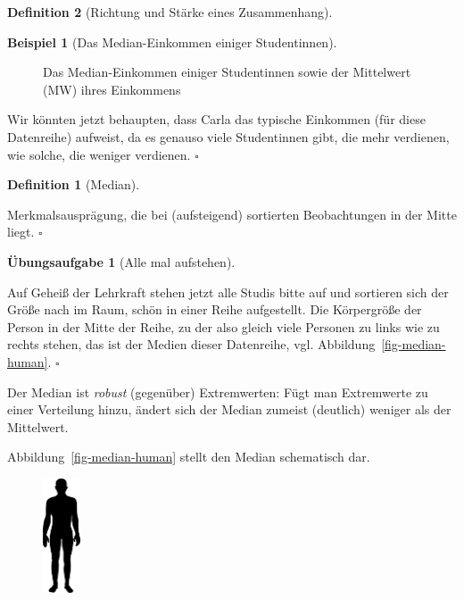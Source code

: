\documentclass[
  a4paper,
  DIV=11]{scrreprt}
\theoremstyle{definition}
\newtheorem{exercise}{Übungsaufgabe}[chapter]
\theoremstyle{definition}
\newtheorem{example}{Beispiel}[chapter]
\theoremstyle{definition}
\newtheorem{definition}{Definition}[chapter]
\theoremstyle{remark}
\begin{document}
\begin{definition}[Richtung und Stärke eines
Zusammenhang]
\begin{example}[Das Median-Einkommen einiger
Studentinnen]
\begin{figure}
\begin{minipage}{\linewidth}
{}


\end{minipage}%

\caption{\label{fig-md1}Das Median-Einkommen einiger Studentinnen sowie
der Mittelwert (MW) ihres Einkommens}

\end{figure}%

Wir könnten jetzt behaupten, dass Carla das typische Einkommen (für
diese Datenreihe) aufweist, da es genauso viele Studentinnen gibt, die
mehr verdienen, wie solche, die weniger verdienen. \(\square\)

\end{example}

\begin{definition}[Median]\protect\hypertarget{def-median}{}\label{def-median}

Merkmalsausprägung, die bei (aufsteigend) sortierten Beobachtungen in
der Mitte liegt. \(\square\)

\end{definition}

\begin{exercise}[Alle mal
aufstehen]\protect\hypertarget{exr-aufstellen}{}\label{exr-aufstellen}

Auf Geheiß der Lehrkraft stehen jetzt alle Studis bitte auf und
sortieren sich der Größe nach im Raum, schön in einer Reihe aufgestellt.
Die Körpergröße der Person in der Mitte der Reihe, zu der also gleich
viele Personen zu links wie zu rechts stehen, das ist der Medien dieser
Datenreihe, vgl. Abbildung~\ref{fig-median-human}. \(\square\)

\end{exercise}

Der Median ist \emph{robust} (gegenüber) Extremwerten: Fügt man
Extremwerte zu einer Verteilung hinzu, ändert sich der Median zumeist
(deutlich) weniger als der Mittelwert.

Abbildung~\ref{fig-median-human} stellt den Median schematisch dar.

\begin{figure}

\begin{minipage}{0.20\linewidth}

\includegraphics[width=0.1\textwidth,height=\textheight]{img/Human_Silhouette.svg.png}


\end{minipage}
\end{figure}
\end{definition}
\end{document}
